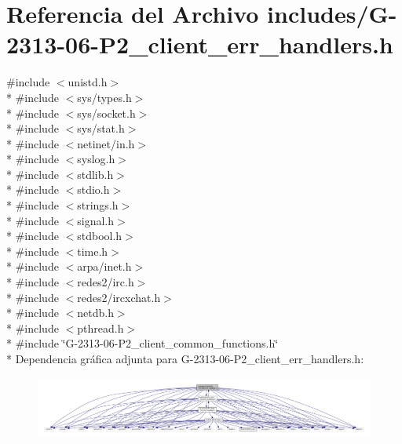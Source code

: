 \hypertarget{G-2313-06-P2__client__err__handlers_8h}{}\section{Referencia del Archivo includes/\+G-\/2313-\/06-\/\+P2\+\_\+client\+\_\+err\+\_\+handlers.h}
\label{G-2313-06-P2__client__err__handlers_8h}
{\ttfamily \#include $<$unistd.\+h$>$}\\*
{\ttfamily \#include $<$sys/types.\+h$>$}\\*
{\ttfamily \#include $<$sys/socket.\+h$>$}\\*
{\ttfamily \#include $<$sys/stat.\+h$>$}\\*
{\ttfamily \#include $<$netinet/in.\+h$>$}\\*
{\ttfamily \#include $<$syslog.\+h$>$}\\*
{\ttfamily \#include $<$stdlib.\+h$>$}\\*
{\ttfamily \#include $<$stdio.\+h$>$}\\*
{\ttfamily \#include $<$strings.\+h$>$}\\*
{\ttfamily \#include $<$signal.\+h$>$}\\*
{\ttfamily \#include $<$stdbool.\+h$>$}\\*
{\ttfamily \#include $<$time.\+h$>$}\\*
{\ttfamily \#include $<$arpa/inet.\+h$>$}\\*
{\ttfamily \#include $<$redes2/irc.\+h$>$}\\*
{\ttfamily \#include $<$redes2/ircxchat.\+h$>$}\\*
{\ttfamily \#include $<$netdb.\+h$>$}\\*
{\ttfamily \#include $<$pthread.\+h$>$}\\*
{\ttfamily \#include \char`\"{}G-\/2313-\/06-\/\+P2\+\_\+client\+\_\+common\+\_\+functions.\+h\char`\"{}}\\*
Dependencia gráfica adjunta para G-\/2313-\/06-\/\+P2\+\_\+client\+\_\+err\+\_\+handlers.h\+:\nopagebreak
\begin{figure}[H]
\begin{center}
\leavevmode
\includegraphics[width=350pt]{G-2313-06-P2__client__err__handlers_8h__incl}
\end{center}
\end{figure}

